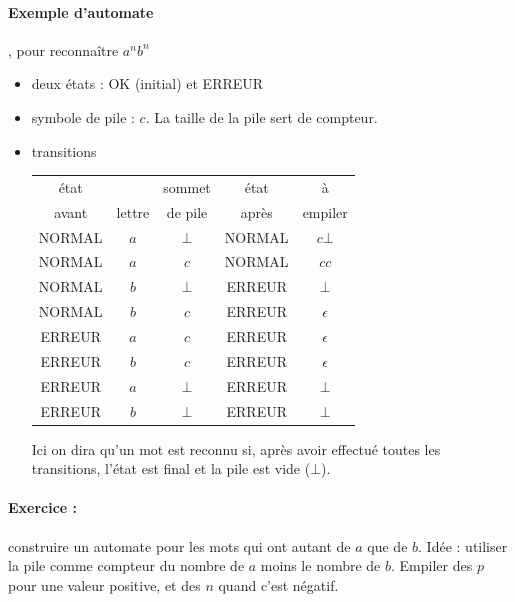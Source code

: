 \documentclass[10pt,twoside]{article}
\begin{document}
\paragraph{Exemple d'automate}, pour reconnaître $a^n b^n$
\begin{itemize}
\item deux états : OK (initial) et ERREUR
\item symbole de pile : $c$. La taille de la pile sert de compteur.
\item transitions
\begin{center}
\begin{tabular}{|c|c|c||c|c|}
\hline
état &       &   sommet &    état &    à  \\ 
avant & lettre & de pile &   après &   empiler \\
\hline
NORMAL  & $a$  &  $\bot$ &    NORMAL  & $c \bot$ \\
NORMAL  & $a$  &  $c$   &   NORMAL  & $c c$ \\
\hline
NORMAL  & $b$  &  $\bot$ &  ERREUR &  $\bot$ \\
NORMAL  & $b$  &  $c$ &  ERREUR &  $\epsilon$ \\
\hline
ERREUR  & $a$ & $c$ & ERREUR & $\epsilon$ \\
ERREUR  & $b$ & $c$ & ERREUR & $\epsilon$ \\
ERREUR  & $a$ & $\bot$ & ERREUR & $\bot$ \\
ERREUR  & $b$ & $\bot$ & ERREUR & $\bot$ \\
\hline
\end{tabular}
\end{center}

Ici on dira qu'un mot est reconnu si, après avoir effectué toutes
les transitions, l'état est final et la pile est vide ($\bot$).
\end{itemize}


\paragraph{Exercice : } construire un automate pour les mots qui ont
autant de $a$ que de $b$. Idée : utiliser la pile comme compteur
du nombre de $a$ moins le nombre de $b$. Empiler des $p$ pour 
une valeur positive, et des $n$ quand c'est négatif.



\end{document}
